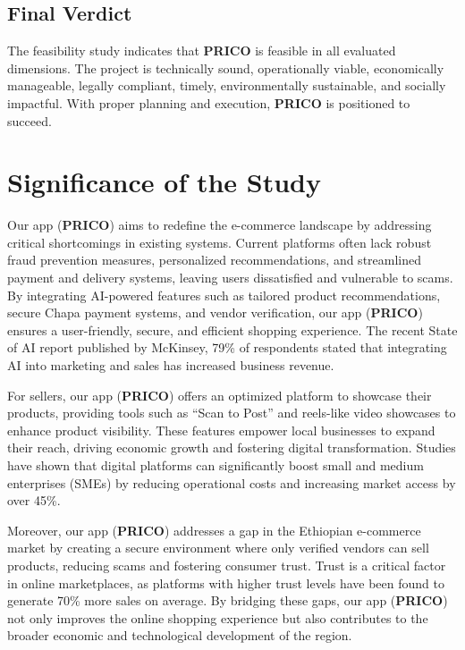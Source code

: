 \documentclass[12pt]{report}
\begin{document}
\subsection*{Final Verdict}

The feasibility study indicates that \textbf{PRICO} is feasible in all evaluated dimensions. The
project is technically sound, operationally viable, economically manageable, legally
compliant, timely, environmentally sustainable, and socially impactful. With proper planning
and execution, \textbf{PRICO} is positioned to succeed.

\section{Significance of the Study}

Our app (\textbf{PRICO}) aims to redefine the e-commerce landscape by addressing critical
shortcomings in existing systems. Current platforms often lack robust fraud prevention
measures, personalized recommendations, and streamlined payment and delivery systems,
leaving users dissatisfied and vulnerable to scams. By integrating AI-powered features such
as tailored product recommendations, secure Chapa payment systems, and vendor
verification, our app (\textbf{PRICO}) ensures a user-friendly, secure, and efficient shopping
experience. The recent State of AI report published by McKinsey, 79\% of respondents stated
that integrating AI into marketing and sales has increased business revenue.\cite{c13}

For sellers, our app (\textbf{PRICO}) offers an optimized platform to showcase their products,
providing tools such as “Scan to Post” and reels-like video showcases to enhance product
visibility. These features empower local businesses to expand their reach, driving economic
growth and fostering digital transformation. Studies have shown that digital platforms can
significantly boost small and medium enterprises (SMEs) by reducing operational costs and
increasing market access by over 45\%. \cite{c14}

Moreover, our app (\textbf{PRICO}) addresses a gap in the Ethiopian e-commerce market by
creating a secure environment where only verified vendors can sell products, reducing scams
and fostering consumer trust. Trust is a critical factor in online marketplaces, as platforms
with higher trust levels have been found to generate 70\% more sales on average. \cite{c15} By
bridging these gaps, our app (\textbf{PRICO}) not only improves the online shopping experience but
also contributes to the broader economic and technological development of the region.
\end{document}
